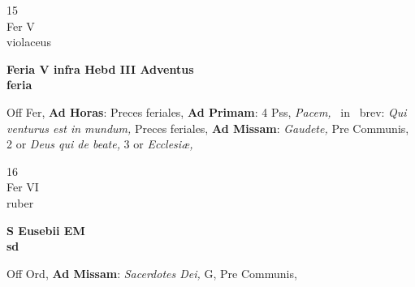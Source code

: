 \documentclass[10pt, openany]{book}
\begin{document}
        \begin{center}
            \begin{minipage}{3.5in}
                \vspace{2em}
                \begin{minipage}{0.5in}
                    {\Huge 15} \\
                    {\normalsize Fer V} \\
                    {\normalsize violaceus}
                \end{minipage}
                \begin{minipage}{3.0in}
                    \textbf{ \large Feria V infra Hebd III Adventus \\
                    \textnormal{\normalsize feria}} \\ 
                \end{minipage}
                \begin{justify}Off Fer, \textbf{Ad Horas}: Preces feriales, \textbf{Ad Primam}: 4 Pss, \textit{Pacem,} \Vbar\ in \Rbar\ brev: \textit{Qui venturus est in mundum,} Preces feriales, \textbf{Ad Missam}: \textit{Gaudete,} Pre Communis, 2 or \textit{Deus qui de beate,} 3 or \textit{Ecclesiæ,}   
                \end{justify}
            \end{minipage}
        \end{center}
    
        \begin{center}
            \begin{minipage}{3.5in}
                \vspace{2em}
                \begin{minipage}{0.5in}
                    {\Huge 16} \\
                    {\normalsize Fer VI} \\
                    {\normalsize ruber}
                \end{minipage}
                \begin{minipage}{3.0in}
                    \textbf{ \large S Eusebii EM \\
                    \textnormal{\normalsize sd}} \\ 
                \end{minipage}
                \begin{justify}Off Ord, \textbf{Ad Missam}: \textit{Sacerdotes Dei,} G, Pre Communis,   
                \end{justify}
            \end{minipage}
        \end{center}
    
\end{document}
